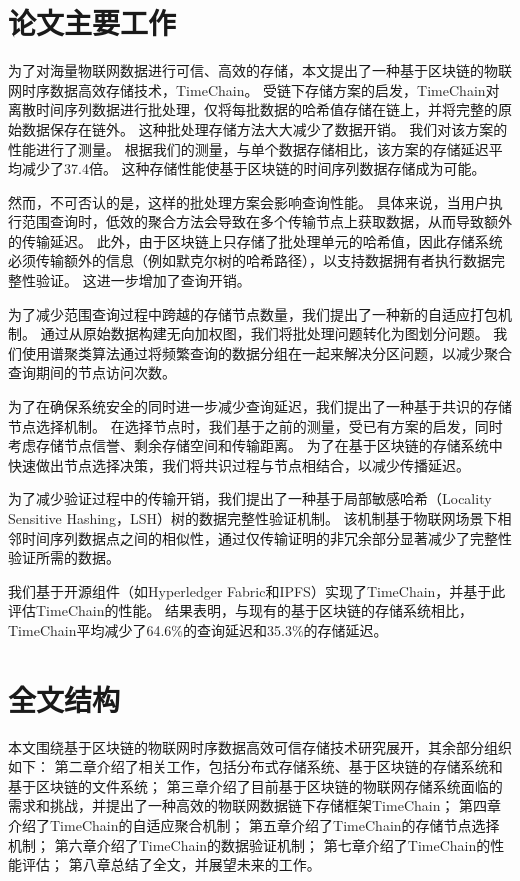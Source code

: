 \section{论文主要工作}
为了对海量物联网数据进行可信、高效的存储，本文提出了一种基于区块链的物联网时序数据高效存储技术，TimeChain。
受链下存储方案的启发，TimeChain对离散时间序列数据进行批处理，仅将每批数据的哈希值存储在链上，并将完整的原始数据保存在链外。
这种批处理存储方法大大减少了数据开销。
我们对该方案的性能进行了测量。
根据我们的测量，与单个数据存储相比，该方案的存储延迟平均减少了37.4倍。
这种存储性能使基于区块链的时间序列数据存储成为可能。

然而，不可否认的是，这样的批处理方案会影响查询性能。
具体来说，当用户执行范围查询时，低效的聚合方法会导致在多个传输节点上获取数据，从而导致额外的传输延迟。
此外，由于区块链上只存储了批处理单元的哈希值，因此存储系统必须传输额外的信息（例如默克尔树的哈希路径），以支持数据拥有者执行数据完整性验证。
这进一步增加了查询开销。

为了减少范围查询过程中跨越的存储节点数量，我们提出了一种新的自适应打包机制。
通过从原始数据构建无向加权图，我们将批处理问题转化为图划分问题。
我们使用谱聚类算法通过将频繁查询的数据分组在一起来解决分区问题，以减少聚合查询期间的节点访问次数。

为了在确保系统安全的同时进一步减少查询延迟，我们提出了一种基于共识的存储节点选择机制。
在选择节点时，我们基于之前的测量，受已有方案的启发，同时考虑存储节点信誉、剩余存储空间和传输距离。
为了在基于区块链的存储系统中快速做出节点选择决策，我们将共识过程与节点相结合，以减少传播延迟。

为了减少验证过程中的传输开销，我们提出了一种基于局部敏感哈希（Locality Sensitive Hashing，LSH）树的数据完整性验证机制。
该机制基于物联网场景下相邻时间序列数据点之间的相似性，通过仅传输证明的非冗余部分显著减少了完整性验证所需的数据。

我们基于开源组件（如Hyperledger Fabric和IPFS）实现了TimeChain，并基于此评估TimeChain的性能。
结果表明，与现有的基于区块链的存储系统相比，TimeChain平均减少了64.6\%的查询延迟和35.3\%的存储延迟。

\section{全文结构}
本文围绕基于区块链的物联网时序数据高效可信存储技术研究展开，其余部分组织如下：
第二章介绍了相关工作，包括分布式存储系统、基于区块链的存储系统和基于区块链的文件系统；
第三章介绍了目前基于区块链的物联网存储系统面临的需求和挑战，并提出了一种高效的物联网数据链下存储框架TimeChain；
第四章介绍了TimeChain的自适应聚合机制；
第五章介绍了TimeChain的存储节点选择机制；
第六章介绍了TimeChain的数据验证机制；
第七章介绍了TimeChain的性能评估；
第八章总结了全文，并展望未来的工作。

